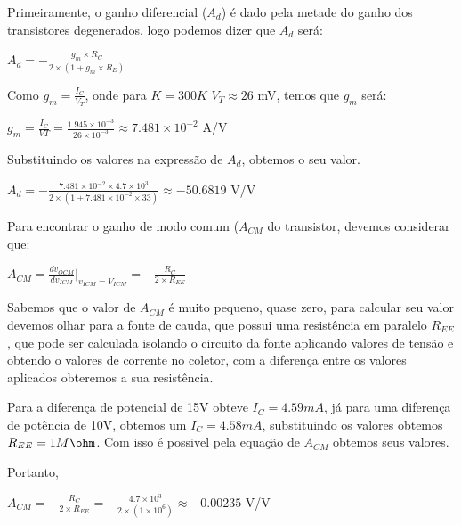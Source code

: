 

Primeiramente, o ganho diferencial ($A_d$) é dado pela metade do ganho dos transistores degenerados, logo podemos dizer que $A_d$ será:

\begin{center}
    $A_d = - \frac{g_m \times R_C}{2 \times (1+g_m \times R_E)}$
\end{center}

Como $g_m = \frac{I_C}{V_T}$, onde para $K=300K$ $V_T \approx 26$ mV, temos que $g_m$ será:

\begin{center}
    $g_m = \frac{I_C}{VT} = \frac{1.945 \times 10^{-3}}{26 \times 10^{-3}} \approx 7.481 \times 10^{-2}$ A/V
\end{center}

Substituindo os valores na expressão de $A_d$, obtemos o seu valor.

\begin{center}
    $A_d = - \frac{7.481 \times 10^{-2} \times 4.7 \times 10^3}{2 \times (1+7.481 \times 10^{-2} \times 33)} \approx -50.6819$ V/V
\end{center}

Para encontrar o ganho de modo comum ($A_{CM}$ do transistor, devemos considerar que:

\begin{center}
    $A_{CM} = \frac{dv_{OCM}}{dv_{ICM}} {\Bigg|_{v_{ICM}=V_{ICM}} = -\frac{R_C}{2 \times R_{EE}}}$
\end{center}

Sabemos que o valor de $A_{CM}$ é muito pequeno, quase zero, para calcular seu valor devemos olhar para a fonte de cauda, que possui uma resistência em paralelo $R_{EE}$, que pode ser calculada isolando o circuito da fonte aplicando valores de tensão e obtendo o valores de corrente no coletor, com a diferença entre os valores aplicados obteremos a sua resistência. 

Para a diferença de potencial de 15V obteve $I_C = 4.59mA$, já para uma diferença de potência de 10V, obtemos um $I_C=4.58mA$, substituindo os valores obtemos $R_{EE} = 1M\ohm$. Com isso é possivel pela equação de $A_{CM}$ obtemos seus valores.

Portanto,

\begin{center}
    $A_{CM}  = -\frac{R_C}{2 \times R_{EE}} = -\frac{4.7 \times 10^3}{2 \times (1 \times 10^6)} \approx -0.00235$ V/V
\end{center}

